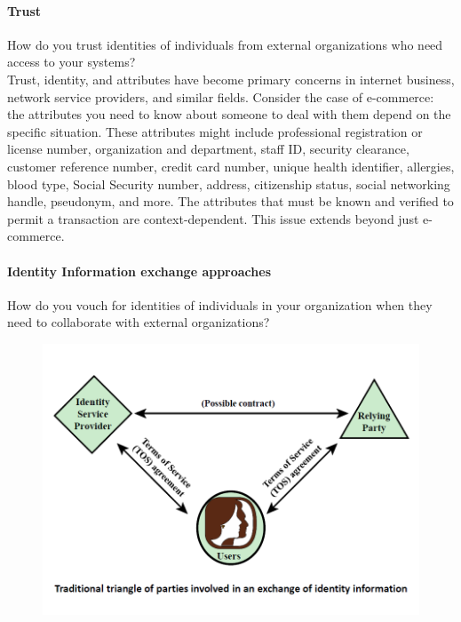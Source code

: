 \documentclass{article}
\begin{document}
                                    \paragraph{Trust}   
                                    How do you trust identities of individuals from external
                                    organizations who need access to your systems?
                                    \\
                                    Trust, identity, and attributes have become primary concerns in internet business, network service providers, and similar fields. Consider the case of e-commerce: the attributes you need to know about someone to deal with them depend on the specific situation. These attributes might include professional registration or license number, organization and department, staff ID, security clearance, customer reference number, credit card number, unique health identifier, allergies, blood type, Social Security number, address, citizenship status, social networking handle, pseudonym, and more. The attributes that must be known and verified to permit a transaction are context-dependent. This issue extends beyond just e-commerce.

                                    \paragraph{Identity Information exchange approaches} How do you vouch for identities of individuals in your
                                    organization when they need to collaborate with external
                                    organizations? \\ 
                                        \begin{figure}[h]
                                            \centering
                                            \includegraphics[scale=0.5]{../immagini/identity_information_exchange.png}
                                           
                                        \end{figure}
    
\end{document}
